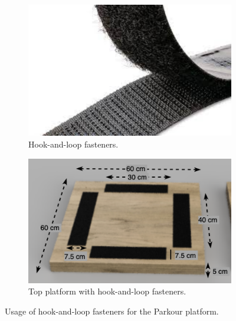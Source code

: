 {\begin{figure}[htb]
  \begin{subfigure}{.45\textwidth}
    \centering
    \includegraphics[width=\textwidth]{img/parkour/hook_and_loop}
    \caption{Hook-and-loop fasteners.}
    \label{fig:parkour-hook-and-loop}
  \end{subfigure}
  \hfill
  \begin{subfigure}{.45\textwidth}
    \centering
    \includegraphics[width=\textwidth]{img/parkour/top_fasteners}
    \caption{Top platform with hook-and-loop fasteners.}
    \label{fig:parkour-top-platform-with-hook-and-loop}
  \end{subfigure}
  \caption{Usage of hook-and-loop fasteners for the Parkour platform.}
\end{figure}

}
